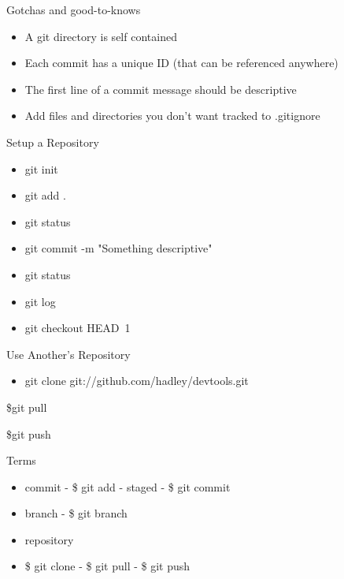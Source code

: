 \documentclass{beamer}
\begin{document}
\begin{frame}{Gotchas and good-to-knows}
  \begin{center}
    \begin{itemize}
      \item A git directory is self contained
      \item Each commit has a unique ID (that can be referenced
        anywhere)
      \item The first line of a commit message should be descriptive
      \item Add files and directories you don't want tracked to
        .gitignore
    \end{itemize}
  \end{center}
\end{frame}

\begin{frame}{Setup a Repository}
  \begin{center}
    \begin{itemize}
      \item git init
      \item git add .
      \item git status
      \item git commit -m "Something descriptive"
      \item git status
      \item git log
      \item git checkout HEAD~1
    \end{itemize}
  \end{center}
\end{frame}

\begin{frame}{Use Another's Repository}
\begin{center}
\begin{itemize}
\item git clone git://github.com/hadley/devtools.git
\end{itemize}
\end{center}
\end{frame}

\begin{frame}{\$git pull}
\end{frame}

\begin{frame}{\$git push}
\end{frame}

\begin{frame}{Terms}
  \begin{center}
    \begin{itemize}
      \item commit - \$ git add - staged - \$ git commit
      \item branch - \$ git branch
      \item repository
      \item \$ git clone - \$ git pull - \$ git push
    \end{itemize}
  \end{center}
\end{frame}
\end{document}
